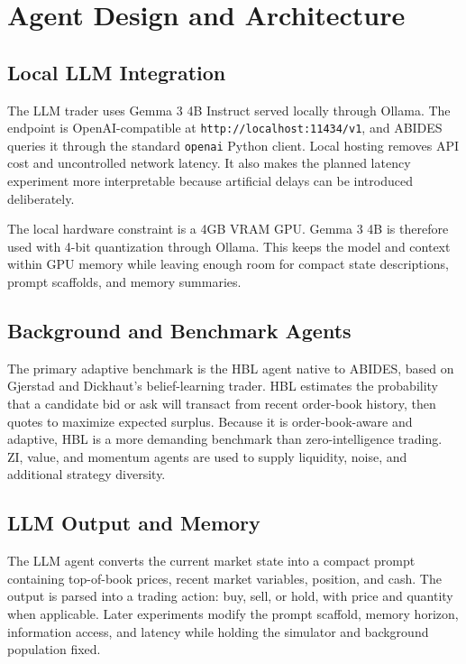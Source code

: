 \documentclass[11pt]{article}
\begin{document}
\section{Agent Design and Architecture}

\subsection{Local LLM Integration}

The LLM trader uses Gemma 3 4B Instruct served locally through Ollama. The endpoint is OpenAI-compatible at \texttt{http://localhost:11434/v1}, and ABIDES queries it through the standard \texttt{openai} Python client. Local hosting removes API cost and uncontrolled network latency. It also makes the planned latency experiment more interpretable because artificial delays can be introduced deliberately.

The local hardware constraint is a 4GB VRAM GPU. Gemma 3 4B is therefore used with 4-bit quantization through Ollama. This keeps the model and context within GPU memory while leaving enough room for compact state descriptions, prompt scaffolds, and memory summaries.

\subsection{Background and Benchmark Agents}

The primary adaptive benchmark is the HBL agent native to ABIDES, based on Gjerstad and Dickhaut's belief-learning trader. HBL estimates the probability that a candidate bid or ask will transact from recent order-book history, then quotes to maximize expected surplus. Because it is order-book-aware and adaptive, HBL is a more demanding benchmark than zero-intelligence trading. ZI, value, and momentum agents are used to supply liquidity, noise, and additional strategy diversity.

\subsection{LLM Output and Memory}

The LLM agent converts the current market state into a compact prompt containing top-of-book prices, recent market variables, position, and cash. The output is parsed into a trading action: buy, sell, or hold, with price and quantity when applicable. Later experiments modify the prompt scaffold, memory horizon, information access, and latency while holding the simulator and background population fixed.
\end{document}
